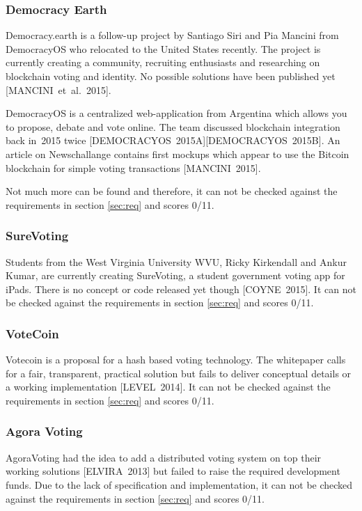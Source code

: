 \documentclass[9pt,oneside]{amsart}
\begin{document}
\begin{multicols}{2}
\subsubsection{Democracy Earth}
Democracy.earth is a follow-up project by Santiago Siri and Pia Mancini from DemocracyOS who relocated to the United States recently. The project is currently creating a community, recruiting enthusiasts and researching on blockchain voting and identity. No possible solutions have been published yet [MANCINI~et~al.~2015].\par
DemocracyOS is a centralized web-application from Argentina which allows you to propose, debate and vote online. The team discussed blockchain integration back in~2015 twice [DEMOCRACYOS~2015A][DEMOCRACYOS~2015B]. An article on Newschallange contains first mockups which appear to use the Bitcoin blockchain for simple voting transactions [MANCINI~2015].\par
Not much more can be found and therefore, it can not be checked against the requirements in section \ref{sec:req} and scores 0/11.

\subsubsection{SureVoting}
Students from the West Virginia University WVU, Ricky Kirkendall and Ankur Kumar, are currently creating SureVoting, a student government voting app for iPads. There is no concept or code released yet though [COYNE~2015]. It can not be checked against the requirements in section \ref{sec:req} and scores 0/11.

\subsubsection{VoteCoin}
Votecoin is a proposal for a hash based voting technology. The whitepaper calls for a fair, transparent, practical solution but fails to deliver conceptual details or a working implementation [LEVEL~2014]. It can not be checked against the requirements in section \ref{sec:req} and scores 0/11.

\subsubsection{Agora Voting}
AgoraVoting had the idea to add a distributed voting system on top their working solutions [ELVIRA~2013] but failed to raise the required development funds. Due to the lack of specification and implementation, it can not be checked against the requirements in section \ref{sec:req} and scores 0/11.


\end{multicols}
\end{document}
